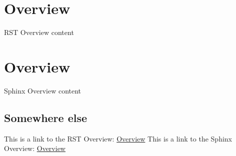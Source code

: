 
\label{index}

\chapter{Overview}
RST Overview content


\chapter{Overview}
Sphinx Overview content

\section{Somewhere else}
This is a link to the RST Overview: \href{index.tex#rst-overview}{Overview}
This is a link to the Sphinx Overview: \href{index.tex#sphinx-overview}{Overview}

